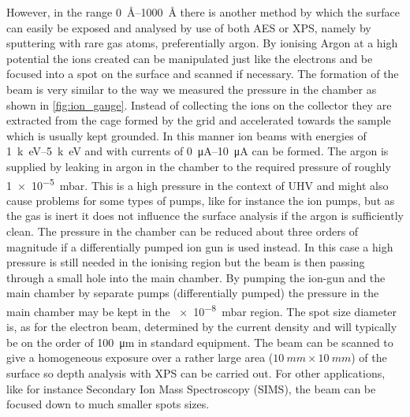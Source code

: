 However, in the range \SIrange{0}{1000}{\angstrom} there is another method by which the surface can easily be exposed and analysed by use of both AES or XPS, namely by sputtering with rare gas atoms, preferentially argon. By ionising Argon at a high potential the ions created can be manipulated just like the electrons and be focused into a spot on the surface and scanned if necessary. The formation of the beam is very similar to the way we measured the pressure in the chamber as shown in \autoref{fig:ion_gauge}. Instead of collecting the ions on the collector they are extracted from the cage formed by the grid and accelerated towards the sample which is usually kept grounded. In this manner ion beams with energies of \SIrange{1}{5}{k\electronvolt} and with currents of \SIrange{0}{10}{\micro A} can be formed. The argon is supplied by leaking in argon in the chamber to the required pressure of roughly \SI{1e-5}{mbar}. This is a high pressure in the context of UHV and might also cause problems for some types of pumps, like for instance the ion pumps, but as the gas is inert it does not influence the surface analysis if the argon is sufficiently clean. The pressure in the chamber can be reduced about three orders of magnitude if a differentially pumped ion gun is used instead. In this case a high pressure is still needed in the ionising region but the beam is then passing through a small hole into the main chamber. By pumping the ion-gun and the main chamber by separate pumps (differentially pumped) the pressure in the main chamber may be kept in the \SI{e-8}{mbar} region. The spot size diameter is, as for the electron beam, determined by the current density and will typically be on the order of \SI{100}{\micro m} in standard equipment. The beam can be scanned to give a homogeneous exposure over a rather large area ($\SI{10}{mm}\times\SI{10}{mm}$) of the surface so depth analysis with XPS can be carried out. For other applications, like for instance Secondary Ion Mass Spectroscopy (SIMS), the beam can be focused down to much smaller spots sizes.

